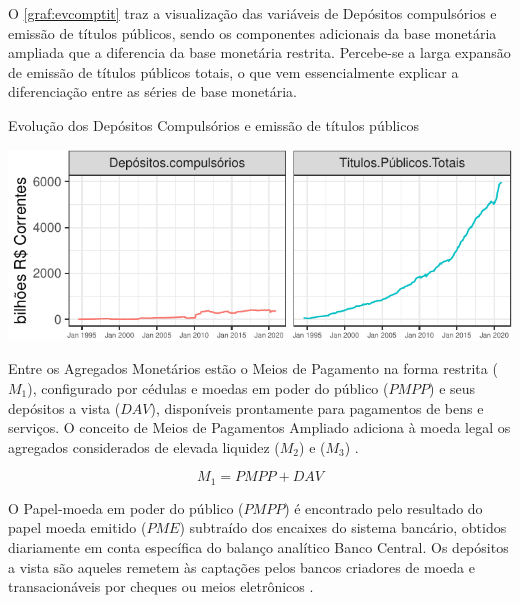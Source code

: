 \documentclass[
  12pt,
  12pt,
  openright,
  oneside,
  a4paper,
  chapter=TITLE,
  section=TITLE,
  subsection=TITLE,
  subsubsection=TITLE,
  portugues,
  sumario=tradicional]{abntex2}
\begin{document}
O \autoref{graf:evcomptit} traz a visualização das variáveis de Depósitos compulsórios e emissão de títulos públicos, sendo os componentes adicionais da base monetária ampliada que a diferencia da base monetária restrita. Percebe-se a larga expansão de emissão de títulos públicos totais, o que vem essencialmente explicar a diferenciação entre as séries de base monetária.

\begin{grafico}[!htbp]
\vspace{20pt}
\caption{Evolução dos Depósitos Compulsórios e emissão de títulos públicos}
\vspace{-4mm}

\begin{center}\includegraphics{12-exportedfigures/base.components-1} \end{center}
\vspace{-3mm}
\label{graf:evcomptit}
\vspace{-2mm}
\end{grafico}

Entre os Agregados Monetários estão o Meios de Pagamento na forma restrita (\(M_1\)), configurado por cédulas e moedas em poder do público (\(PMPP\)) e seus depósitos a vista (\(DAV\)), disponíveis prontamente para pagamentos de bens e serviços. O conceito de Meios de Pagamentos Ampliado adiciona à moeda legal os agregados considerados de elevada liquidez (\(M_2\)) e (\(M_3\)) \cite{bcb:2019, sgs:mpa}.

\begin{equation}
M_1 = PMPP + DAV
\end{equation}

O Papel-moeda em poder do público (\(PMPP\)) é encontrado pelo resultado do papel moeda emitido (\(PME\)) subtraído dos encaixes do sistema bancário, obtidos diariamente em conta específica do balanço analítico Banco Central. Os depósitos a vista são aqueles remetem às captações pelos bancos criadores de moeda e transacionáveis por cheques ou meios eletrônicos \cite{sgs:m1}.
\end{document}
